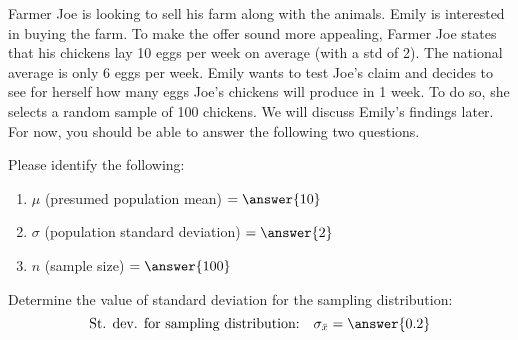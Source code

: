 \documentclass{ximera}
\begin{document}
\begin{problem}\label{pr:farmerJoe}
Farmer Joe is looking to sell his farm along with the animals. Emily is interested in buying the farm. To make the offer sound more appealing, Farmer Joe states that his chickens lay 10 eggs per week on average (with a std of 2).  The national average is only 6 eggs per week. Emily wants to test Joe’s claim and decides to see for herself how many eggs Joe's chickens will produce in 1 week. To do so, she selects a random sample of 100 chickens. We will discuss Emily's findings later.  For now, you should be able to answer the following two questions.

\begin{question}
Please identify the following:
 \begin{enumerate}
     \item $\mu$ (presumed population mean) $= \answer{10}$
     \item $\sigma$ (population standard deviation) $= \answer{2}$
     \item $n$ (sample size) $= \answer{100}$
\end{enumerate}
\end{question}

\begin{question}
Determine the value of standard deviation for the sampling distribution:
$$\mbox{St. dev. for sampling distribution:}\quad\sigma_{\bar{x}}= \answer{0.2}$$
\end{question}



\end{problem}
\end{document}
